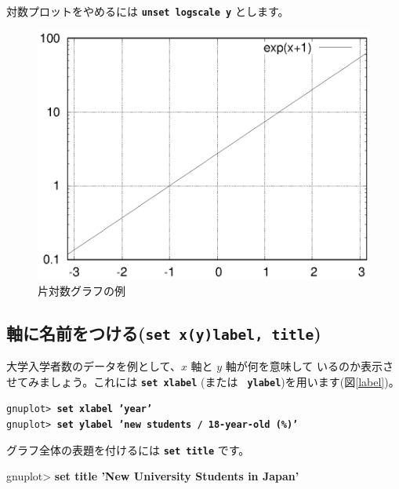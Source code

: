\documentclass[a4j]{ujarticle} %
\newenvironment{terminal}{%
  \begin{center}
   \begin{minipage}{.8\textwidth}
    \setlength{\FrameSep}{.5\FrameSep}%
    \begin{framed}\ttfamily\small%
     \setlength\baselineskip{.85\baselineskip}%
}{%
    \end{framed}
   \end{minipage}
  \end{center}%
}
\begin{document}
対数プロットをやめるには {\tt\bf unset logscale y} とします。

\begin{figure}
\begin{center}
\begin{minipage}[hbtp]{0.49\textwidth}
\includegraphics[width=\hsize]{exp.eps}
\caption{片対数グラフの例}
\label{exp}
\end{minipage}
\end{center}
\end{figure}


\subsection{軸に名前をつける({\tt\bf set x(y)label, title})}
大学入学者数のデータを例として、$x$ 軸と $y$ 軸が何を意味して
いるのか表示させてみましょう。これには {\tt\bf set xlabel} (または {\tt\bf
ylabel})を用います(図\ref{label})。
\begin{terminal}
{\tt gnuplot> {\bf set xlabel 'year'}} \\
{\tt gnuplot> {\bf set ylabel 'new students / 18-year-old (\%)'}}
\end{terminal}
グラフ全体の表題を付けるには {\tt\bf set title} です。
\begin{terminal}
gnuplot> {\bf set title 'New University Students in Japan'}
\end{terminal}
\end{document}
